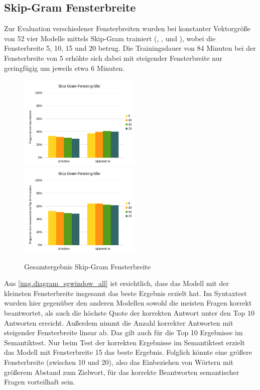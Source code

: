 \subsection{Skip-Gram Fensterbreite}
Zur Evaluation verschiedener Fensterbreiten wurden bei konstanter Vektorgröße von 52 vier Modelle mittels Skip-Gram trainiert (, ,  und ), wobei die Fensterbreite 5, 10, 15 und 20 betrug. Die Trainingsdauer von 84 Minuten bei der Fensterbreite von 5 erhöhte sich dabei mit steigender Fensterbreite nur geringfügig um jeweils etwa 6 Minuten.

\begin{figure}[H]
\begin{adjustwidth}{-4mm}{-4mm}
\centering
{}
{\includegraphics[width=0.52\textwidth]{images/diagram_sgwindow_correct_all}}
{\includegraphics[width=0.52\textwidth]{images/diagram_sgwindow_top10_all}}
\caption[Gesamtergebnis Skip-Gram Fensterbreite]{Gesamtergebnis Skip-Gram Fensterbreite}\label{img.diagram_sgwindow_all}
\end{adjustwidth}
\end{figure}

Aus \autoref{img.diagram_sgwindow_all} ist ersichtlich, dass das Modell  mit der kleinsten Fensterbreite insgesamt das beste Ergebnis erzielt hat. Im Syntaxtest wurden hier gegenüber den anderen Modellen sowohl die meisten Fragen korrekt beantwortet, als auch die höchste Quote der korrekten Antwort unter den Top 10 Antworten erreicht. Außerdem nimmt die Anzahl korrekter Antworten mit steigender Fensterbreite linear ab. Das gilt auch für die Top 10 Ergebnisse im Semantiktest. Nur beim Test der korrekten Ergebnisse im Semantiktest erzielt das Modell mit Fensterbreite 15 das beste Ergebnis. Folglich könnte eine größere Fensterbreite (zwischen 10 und 20), also das Einbeziehen von Wörtern mit größerem Abstand zum Zielwort, für das korrekte Beantworten semantischer Fragen vorteilhaft sein.

